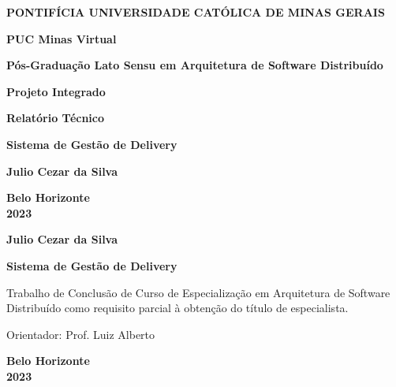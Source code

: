 \begin{titlepage}
    \begin{center}
        \textbf{\Large PONTIFÍCIA UNIVERSIDADE CATÓLICA DE MINAS GERAIS}

        \vspace{0.5cm}

        \textbf{\Large PUC Minas Virtual}
        
        \vspace{2cm}
        
        \textbf{\Large Pós-Graduação Lato Sensu em Arquitetura de Software Distribuído}
        
        \vspace{2cm}
        
        \textbf{\Large Projeto Integrado}
        
        \vspace{0.5cm}
        
        \textbf{\Large Relatório Técnico}

        \vspace{1cm}

        \textbf{\Large Sistema de Gestão de Delivery}
        
        \vspace{4cm}
        
        \textbf{\Large Julio Cezar da Silva}
        
        \vspace{4cm}
        
        \textbf{\Large Belo Horizonte}\\
        \textbf{\Large 2023}
    \end{center}
    
    \newpage
    \thispagestyle{empty}
    
    \begin{center}
        \textbf{\Large Julio Cezar da Silva}
    \end{center}
    
    \vspace{4cm}
    
    \begin{center}
        \textbf{\Large Sistema de Gestão de Delivery}
    \end{center}
    
    \vspace{1cm}
    
    \begin{flushright}
        Trabalho de Conclusão de Curso de Especialização em Arquitetura de Software Distribuído como requisito parcial à obtenção do título de especialista.
    \end{flushright}
    
    \vspace{4cm}
    
    \begin{flushleft}
        Orientador: Prof. Luiz Alberto
    \end{flushleft}
    
    \vspace{2cm}
    
    \begin{center}
        \textbf{\Large Belo Horizonte}\\
        \textbf{\Large 2023}
    \end{center}
    
\end{titlepage}
